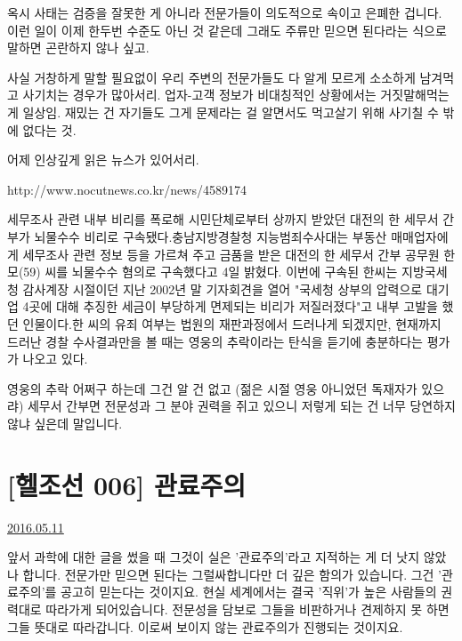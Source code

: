 옥시 사태는 검증을 잘못한 게 아니라 전문가들이 의도적으로 속이고 은폐한 겁니다.
이런 일이 이제 한두번 수준도 아닌 것 같은데 그래도 주류만 믿으면 된다라는 식으로 말하면 곤란하지 않나 싶고.
\vspace{5mm}

사실 거창하게 말할 필요없이 우리 주변의 전문가들도 다 알게 모르게 소소하게 남겨먹고 사기치는 경우가 많아서리.
업자-고객 정보가 비대칭적인 상황에서는 거짓말해먹는 게 일상임.
재밌는 건 자기들도 그게 문제라는 걸 알면서도 먹고살기 위해 사기칠 수 밖에 없다는 것.
\vspace{5mm}

어제 인상깊게 읽은 뉴스가 있어서리.
\vspace{5mm}

http://www.nocutnews.co.kr/news/4589174
\vspace{5mm}

세무조사 관련 내부 비리를 폭로해 시민단체로부터 상까지 받았던 대전의 한 세무서 간부가 뇌물수수 비리로 구속됐다.충남지방경찰청 지능범죄수사대는 부동산 매매업자에게 세무조사 관련 정보 등을 가르쳐 주고 금품을 받은 대전의 한 세무서 간부 공무원 한모(59) 씨를 뇌물수수 혐의로 구속했다고 4일 밝혔다.
이번에 구속된 한씨는 지방국세청 감사계장 시절이던 지난 2002년 말 기자회견을 열어 "국세청 상부의 압력으로 대기업 4곳에 대해 추징한 세금이 부당하게 면제되는 비리가 저질러졌다"고 내부 고발을 했던 인물이다.한 씨의 유죄 여부는 법원의 재판과정에서 드러나게 되겠지만, 현재까지 드러난 경찰 수사결과만을 볼 때는 영웅의 추락이라는 탄식을 듣기에 충분하다는 평가가 나오고 있다.
\vspace{5mm}

영웅의 추락 어쩌구 하는데 그건 알 건 없고 (젊은 시절 영웅 아니었던 독재자가 있으랴)
세무서 간부면 전문성과 그 분야 권력을 쥐고 있으니 저렇게 되는 건 너무 당연하지 않냐 싶은데 말입니다.
\vspace{5mm}










\section{[헬조선 006] 관료주의}
\href{https://www.kockoc.com/Apoc/769156}{2016.05.11}

\vspace{5mm}

앞서 과학에 대한 글을 썼을 때 그것이 실은 '관료주의'라고 지적하는 게 더 낫지 않았나 합니다.
전문가만 믿으면 된다는 그럴싸합니다만 더 깊은 함의가 있습니다. 그건 '관료주의'를 공고히 믿는다는 것이지요.
현실 세계에서는 결국 '직위'가 높은 사람들의 권력대로 따라가게 되어있습니다.
전문성을 담보로 그들을 비판하거나 견제하지 못 하면 그들 뜻대로 따라갑니다. 이로써 보이지 않는 관료주의가 진행되는 것이지요.
\vspace{5mm}

